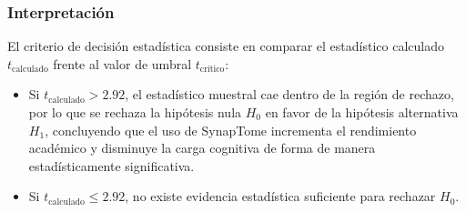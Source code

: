 \subsubsection{Interpretación}
El criterio de decisión estadística consiste en comparar el estadístico calculado $t_{\text{calculado}}$ frente al valor de umbral $t_{\text{crítico}}$:
\begin{itemize}
    \item Si $t_{\text{calculado}} > 2.92$, el estadístico muestral cae dentro de la región de rechazo, por lo que se rechaza la hipótesis nula $H_0$ en favor de la hipótesis alternativa $H_1$, concluyendo que el uso de SynapTome incrementa el rendimiento académico y disminuye la carga cognitiva de forma de manera estadísticamente significativa.
    \item Si $t_{\text{calculado}} \leq 2.92$, no existe evidencia estadística suficiente para rechazar $H_0$.
\end{itemize}